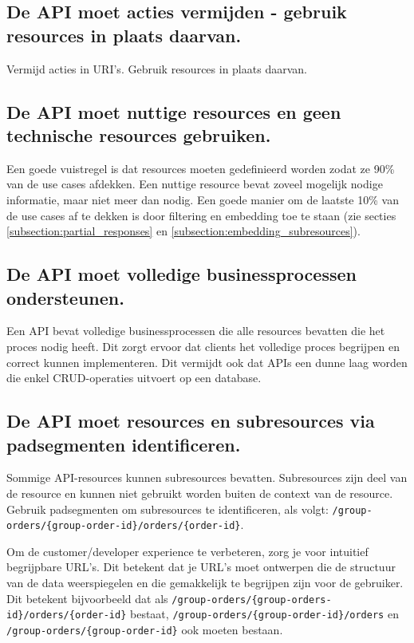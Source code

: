 \subsection{De API moet acties vermijden - gebruik resources in plaats daarvan.}
\label{section:vermijd_acties}

Vermijd acties in URI's. Gebruik resources in plaats daarvan.

\subsection{De API moet nuttige resources en geen technische resources gebruiken.}
\label{section:nuttige_resources}

Een goede vuistregel is dat resources moeten gedefinieerd worden zodat ze 90\% van de use cases afdekken. Een nuttige resource bevat zoveel mogelijk nodige informatie, maar niet meer dan nodig. Een goede manier om de laatste 10\% van de use cases af te dekken is door filtering en embedding toe te staan (zie secties \ref{subsection:partial_responses} en \ref{subsection:embedding_subresources}).

\subsection{De API moet volledige businessprocessen ondersteunen.}
\label{section:volledige_businessprocessen}

Een API bevat volledige businessprocessen die alle resources bevatten die het proces nodig heeft. Dit zorgt ervoor dat clients het volledige proces begrijpen en correct kunnen implementeren. Dit vermijdt ook dat APIs een dunne laag worden die enkel CRUD-operaties uitvoert op een database.

\subsection{De API moet resources en subresources via padsegmenten identificeren.}
\label{section:resources_subresources_padsegmenten}

Sommige API-resources kunnen subresources bevatten. Subresources zijn deel van de resource en kunnen niet gebruikt worden buiten de context van de resource. Gebruik padsegmenten om subresources te identificeren, als volgt: \texttt{/group-orders/\{group-order-id\}/orders/\{order-id\}}.

\bigskip

Om de customer/developer experience te verbeteren, zorg je voor intuitief begrijpbare URL's. Dit betekent dat je URL's moet ontwerpen die de structuur van de data weerspiegelen en die gemakkelijk te begrijpen zijn voor de gebruiker. Dit betekent bijvoorbeeld dat als \texttt{/group-orders/\{group-orders-id\}/orders/\{order-id\}} bestaat, \texttt{/group-orders/\{group-order-id\}/orders} en \texttt{/group-orders/\{group-order-id\}} ook moeten bestaan.

